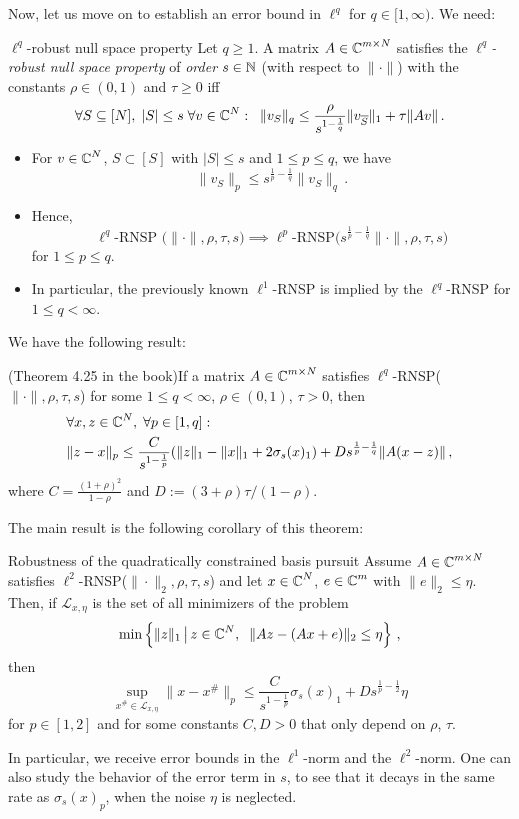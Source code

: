 \documentclass[a4paper]{article}
\begin{document}
    Now, let us move on to establish an error bound in \(\ell^q\) for \(q\in [1,\infty)\). We need:
    \begin{Def*}
 {$\ell^q$-robust null space property}{}
 Let \(q\ge 1\). A matrix \(A\in \operatorname{\mathbb C}^{m\times N}\) satisfies the \emph{$\ell^q$-robust null space property} of \emph{order} \(s\in \operatorname{\mathbb N}\) (with respect to \(\|\cdot\|\)) with the constants \(\rho\in (0,1)\) and \(\tau\ge0\) iff
 \[\forall S\subseteq [N],\;|S|\le s\;\forall v\in \operatorname{\mathbb C}^N:\;\;\|v_S\|_q\le \frac{\rho}{s^{1-\frac{1}{q}}}\|v_{\overline S}\|_1+\tau\|Av\|\,.\]
 \end{Def*}
 \begin{Bemerkung*}{}{}
     \begin{itemize}
		\item For \(v\in \operatorname{\mathbb C}^N \), \(S\subset [S]\) with \(|S|\le s\) and \(1\le p\le q\), we have 
		\[\|v_S\|_p\le s^{\frac{1}{p}-\frac{1}{q}}\|v_S\|_q\,.\]
		\item Hence, 
		\[
		\ell^q
		\text{-RNSP
		($\|\cdot\|,\rho,\tau,s$)}
		\implies \ell^p \text{-RNSP($s^{\frac{1}{p}-\frac{1}{q}}\|\cdot\|,\rho,\tau,s$)}
		\]
        for \(1\le p\le q\).
		\item In particular, the previously known \(\ell^1\)-RNSP is implied by the \(\ell^q\)-RNSP for \(1\le q<\infty\).
	\end{itemize}
 \end{Bemerkung*}    

 We have the following result:
 \begin{Satz*}
		{(Theorem 4.25 in the book)}{}If a matrix \(A\in \operatorname{\mathbb C}^{m\times N}\) satisfies \(\ell^q\)-RNSP($\|\cdot\|,\rho,\tau,s$) for some \(1\le q<\infty\), \(\rho\in (0,1)\), \(\tau>0\), then
		\begin{align*}
			&\forall x,z\in \operatorname{\mathbb C}^N,\;\forall p\in [1,q]:\\
			&\|z-x\|_p\le \frac{C}{s^{1-\frac{1}{p}}}(\|z\|_1-\|x\|_1+2\sigma_s(x)_1)+Ds^{\frac{1}{p}-\frac{1}{q}}\|A(x-z)\|\,,\\
		\end{align*}
		where \(C=\frac{(1+\rho)^2}{1-\rho}\) and \(D:=(3+\rho)\tau/(1-\rho)\).
	\end{Satz*}

   The main result is the following corollary of this theorem:
   \begin{Kor*}
		{Robustness of the quadratically constrained basis pursuit}{}
		Assume \(A\in \operatorname{\mathbb C}^{m\times N }\) satisfies \(\ell^2 \)-RNSP($\|\cdot\|_2,\rho,\tau, s$) and let \(x\in \operatorname{\mathbb C}^N\), \(e\in \operatorname{\mathbb C}^m\) with \(\|e\|_2\le \eta\). Then, if \(\mathcal L_{x,\eta}\) is the set of all minimizers of the problem
		\[\min\left\{\|z\|_1\,\big|\,z\in \operatorname{\mathbb C}^N,\;\;\|Az-(Ax+e)\|_2\le \eta\right\}\,,\]
		then
		\[\sup_{x^{\#}\in \mathcal L_{x,\eta}}\|x-x^{\#}\|_p\le \frac{C}{s^{1-\frac{1}{p}}}\sigma_s(x)_1+Ds^{\frac{1}{p}-\frac{1}{2}}\eta\]
		for \(p\in [1,2]\) and for some constants \(C,D>0\) that only depend on \(\rho\), \(\tau\).
	\end{Kor*} 
In particular, we receive error bounds in the \(\ell^1\)-norm and the \(\ell^2\)-norm. One can also study the behavior of the error term in \(s\), to see that it decays in the same rate as \(\sigma_s(x)_p\), when the noise \(\eta\) is neglected.
\end{document}
